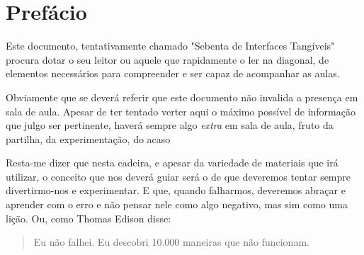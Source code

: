 \chapter{Prefácio}

Este documento, tentativamente chamado "Sebenta de Interfaces Tangíveis" procura dotar o seu leitor ou aquele que rapidamente o ler na diagonal, de elementos necessários para compreender e ser capaz de acompanhar as aulas.

Obviamente que se deverá referir que este documento não invalida a presença em sala de aula. Apesar de ter tentado verter aqui o máximo possível de informação que julgo ser pertinente, haverá sempre algo \textit{extra} em sala de aula, fruto da partilha, da experimentação, do acaso

Resta-me dizer que nesta cadeira, e apesar da variedade de materiais que irá utilizar, o conceito que nos deverá guiar será o de que deveremos tentar sempre divertirmo-nos e experimentar. E que, quando falharmos, deveremos abraçar e aprender com o erro e não pensar nele como algo negativo, mas sim como uma lição. Ou, como Thomas Edison disse: 
\begin{quotation}
	
	
	Eu não falhei. Eu descobri 10.000 maneiras que não funcionam.
	
\end{quotation}